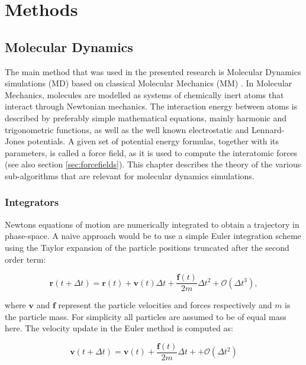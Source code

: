 \documentclass[english, a4paper, 12pt, titlepage, draft]{article}
\newcommand{\vect}[1]{\mathbf{#1}}
\newcommand{\vfun}[2]{\vect{#1}\left(#2\right)}
\begin{document}

\section{Methods}
\subsection{Molecular Dynamics}

The main method that was used in the presented research is Molecular Dynamics simulations (MD) based on classical Molecular Mechanics (MM) \cite{MDintro}.
In Molecular Mechanics, molecules are modelled as systems of chemically inert atoms that interact through Newtonian mechanics.
The interaction energy between atoms is described by preferably simple mathematical equations, mainly harmonic and trigonometric functions, as well as the well known electrostatic and Lennard-Jones potentials.
A given set of potential energy formulas, together with its parameters, is called a force field, as it is used to compute the interatomic forces (see also section \ref{sec:forcefields}).
This chapter describes the theory of the various sub-algorithms that are relevant for molecular dynamics simulations.


\subsubsection{Integrators}

Newtons equations of motion are numerically integrated to obtain a trajectory in phase-space.
A naive approach would be to use a simple Euler integration scheme \cite{Euler} using the Taylor expansion of the particle positions truncated after the second order term:

\begin{equation}
    \vfun{r}{t+\Delta t} = \vfun{r}{t} + \vfun{v}{t}\Delta t + \frac{\vfun{f}{t}}{2m} \Delta t^2 + \mathcal{O}(\Delta t^3),
    \label{eq:Euler}
\end{equation} 

 where $\vect{v}$ and $\vect{f}$ represent the particle velocities and forces respectively and $m$ is the particle mass. 
For simplicity all particles are assumed to be of equal mass here.
The velocity update in the Euler method is computed as:

\begin{equation}
    \vfun{v}{t+\Delta t} = \vfun{v}{t} + \frac{\vfun{f}{t}}{2m} \Delta t+ + \mathcal{O}(\Delta t^2)
\end{equation}
\end{document}
